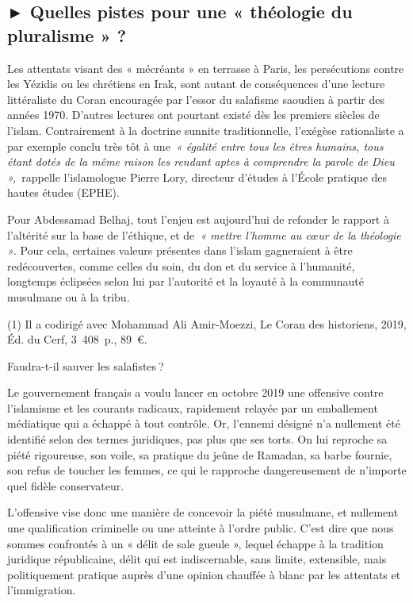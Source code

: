 \subsection{► Quelles pistes pour une « théologie du pluralisme » ?}

Les attentats visant des « mécréants » en terrasse à Paris, les
persécutions contre les Yézidis ou les chrétiens en Irak, sont autant de
conséquences d'une lecture littéraliste du Coran encouragée par l'essor
du salafisme saoudien à partir des années 1970. D'autres lectures ont
pourtant existé dès les premiers siècles de l'islam. Contrairement à la
doctrine sunnite traditionnelle, l'exégèse rationaliste a par exemple
conclu très tôt à une~\emph{« égalité entre tous les êtres humains, tous
étant dotés de la même raison les rendant aptes à comprendre la parole
de Dieu »,~}rappelle l'islamologue Pierre Lory, directeur d'études à
l'École pratique des hautes études (EPHE).

Pour Abdessamad Belhaj, tout l'enjeu est aujourd'hui de refonder le
rapport à l'altérité sur la base de l'éthique, et de\emph{~« mettre
l'homme au cœur de la théologie »}. Pour cela, certaines valeurs
présentes dans l'islam gagneraient à être redécouvertes, comme celles du
soin, du don et du service à l'humanité, longtemps éclipsées selon lui
par l'autorité et la loyauté à la communauté musulmane ou à la tribu.

(1) Il a codirigé avec Mohammad Ali Amir-Moezzi, Le Coran des
historiens, 2019, Éd. du Cerf, 3~408~p., 89~€.

Faudra-t-il sauver les salafistes ?

Le gouvernement français a voulu lancer en octobre 2019 une offensive
contre l'islamisme et les courants radicaux, rapidement relayée par un
emballement médiatique qui a échappé à tout contrôle. Or, l'ennemi
désigné n'a nullement été identifié selon des termes juridiques, pas
plus que ses torts. On lui reproche sa piété rigoureuse, son voile, sa
pratique du jeûne de Ramadan, sa barbe fournie, son refus de toucher les
femmes, ce qui le rapproche dangereusement de n'importe quel fidèle
conservateur.

L'offensive vise donc une manière de concevoir la piété musulmane, et
nullement une qualification criminelle ou une atteinte à l'ordre public.
C'est dire que nous sommes confrontés à un « délit de sale gueule »,
lequel échappe à la tradition juridique républicaine, délit qui est
indiscernable, sans limite, extensible, mais politiquement pratique
auprès d'une opinion chauffée à blanc par les attentats et
l'immigration.


